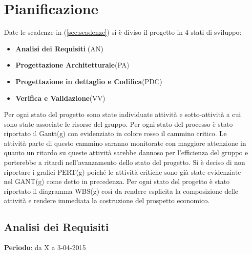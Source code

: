 
\section{Pianificazione}{
	
	Date le scadenze in (\ref{sec:scadenze}) si \`{è} diviso il progetto in 4 stati di sviluppo:
	\begin{itemize}
		\item \textbf{Analisi dei Requisiti} (AN)
		\item \textbf{Progettazione Architetturale}(PA)
		\item \textbf{Progettazione in dettaglio e Codifica}(PDC)
		\item \textbf{Verifica e Validazione}(VV)
	\end{itemize}
	
	Per ogni stato del progetto sono state individuate attivit\`{a} e sotto-attivit\`{a} a cui sono state associate le risorse del gruppo.
	Per ogni stato del processo \`{e} stato riportato il Gantt(g) con evidenziato in colore rosso il cammino critico.
	Le attivit\`{a} parte di questo cammino saranno monitorate con maggiore attenzione in quanto un ritardo su queste attivit\`{a} 
	sarebbe dannoso per l'efficienza del gruppo e porterebbe a ritardi nell'avanzamento dello stato del progetto.
	Si \`{e} deciso di non riportare i grafici PERT(g) poich\'{e} le attivit\`{a} critiche sono gi\`{a} state evidenziate nel GANT(g) come detto in precedenza.
	Per ogni stato del progetto \`{e} stato riportato il diagramma WBS(g) cos\`{i} da rendere esplicita la composizione delle attivit\`{a} e rendere immediata la costruzione del prospetto economico.
	
	\subsection{Analisi dei Requisiti}{
	\textbf{Periodo}: da X a 3-04-2015 \\
	
}}
